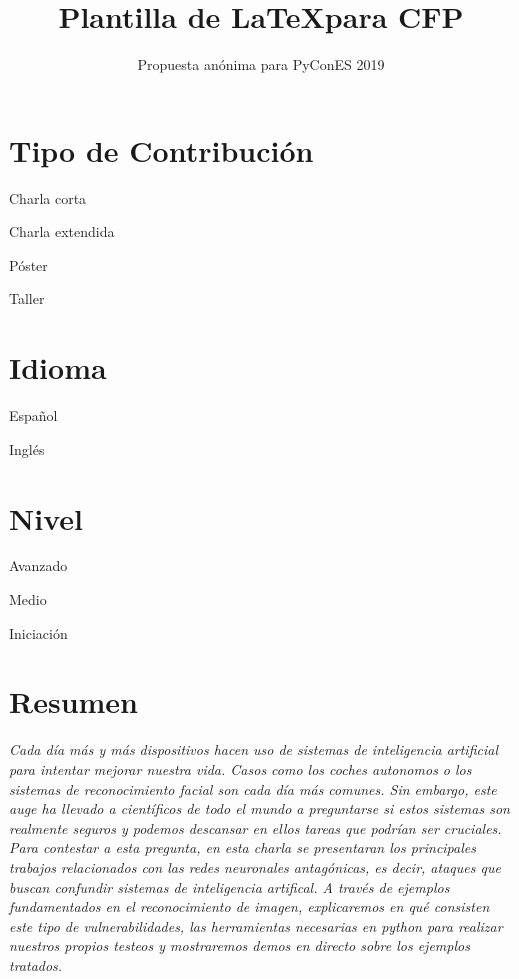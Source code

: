 \documentclass[runningheads]{llncs}
\newcommand{\cmark}{\ding{51}}%
\newcommand{\done}{\rlap{$\square$}{\raisebox{2pt}{\large\hspace{1pt}\cmark}}%
\hspace{-2.5pt}}
\begin{document}
\pagestyle{headings}
\mainmatter


\title{Plantilla de \LaTeX para CFP} %


\author{Propuesta an\'onima para PyConES 2019}

\maketitle

\section{Tipo de Contribuci\'on}

\begin{todolist}
  \item Charla corta
  \item [\done]Charla extendida
  \item P\'oster
  \item Taller
  \end{todolist}


\section{Idioma}
\begin{todolist}
  \item [\done]Espa\~nol
  \item Ingl\'es
\end{todolist}
\section{Nivel}

\begin{todolist}
  \item Avanzado
  \item [\done] Medio
  \item Iniciaci\'on
  \end{todolist}


\newpage

\section{Resumen}
\textit{Cada d\'ia m\'as y m\'as dispositivos hacen uso de sistemas de inteligencia artificial para intentar mejorar nuestra vida. Casos como los coches autonomos o los sistemas de reconocimiento facial son cada día más comunes. Sin embargo, este auge ha llevado a cient\'ificos de todo el mundo a preguntarse si estos sistemas son realmente seguros y podemos descansar en ellos tareas que podrían ser cruciales. Para contestar a esta pregunta, en esta charla se presentaran los principales trabajos relacionados con las redes neuronales antag\'onicas, es decir, ataques que buscan confundir sistemas de inteligencia artifical. A trav\'es de ejemplos fundamentados en el reconocimiento de imagen, explicaremos en qu\'e consisten este tipo de vulnerabilidades, las herramientas necesarias en python para realizar nuestros propios testeos y mostraremos demos en directo sobre los ejemplos tratados.}
\end{document}
